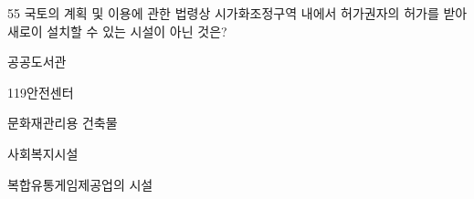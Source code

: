 \begin{question}{55}
국토의 계획 및 이용에 관한 법령상 시가화조정구역 내에서 허가권자의 허가를 받아 새로이 설치할 수 있는 시설이 아닌 것은?
\begin{choices}
  \item 공공도서관
  \item 119안전센터
  \item 문화재관리용 건축물
  \item 사회복지시설
  \item 복합유통게임제공업의 시설
\end{choices}
\end{question}
